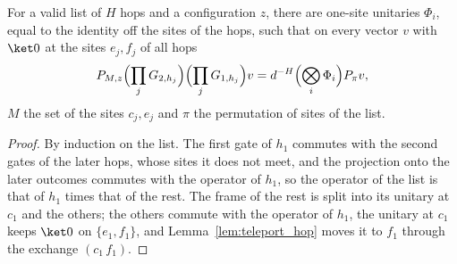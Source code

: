 \begin{lemma}
    \label{lem:teleport_chain_pre}
    \leanok
    For a valid list of $H$ hops and a configuration $z$, there are one-site
    unitaries $\Phi_i$, equal to the identity off the sites of the hops, such
    that on every vector $v$ with $\ket0$ at the sites $e_j,f_j$ of all hops
    \[
        P_{M,z}\Bigl(\prod_jG_{2,h_j}\Bigr)\Bigl(\prod_jG_{1,h_j}\Bigr)v
        =d^{-H}\Bigl(\bigotimes_i\Phi_i\Bigr)P_\pi v,
    \]
    $M$ the set of the sites $c_j,e_j$ and $\pi$ the permutation of sites of
    the list.
\end{lemma}
\begin{proof}
    \leanok
    By induction on the list. The first gate of $h_1$ commutes with the second
    gates of the later hops, whose sites it does not meet, and the projection
    onto the later outcomes commutes with the operator of $h_1$, so the
    operator of the list is that of $h_1$ times that of the rest. The frame of
    the rest is split into its unitary at $c_1$ and the others; the others
    commute with the operator of $h_1$, the unitary at $c_1$ keeps $\ket0$ on
    $\{e_1,f_1\}$, and Lemma~\ref{lem:teleport_hop} moves it to $f_1$ through
    the exchange $(c_1\,f_1)$.
\end{proof}

